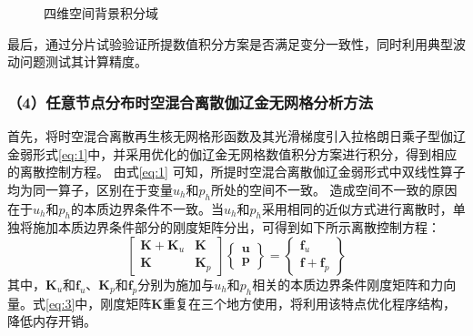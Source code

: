 \vspace{20pt}
\begin{figure}[!h]
    \centering 
    \hspace{24pt}
    \caption{四维空间背景积分域}
    \label{fg:domain}
\end{figure}
\newpage

最后，通过分片试验验证所提数值积分方案是否满足变分一致性，同时利用典型波动问题测试其计算精度。

\subsubsection*{\bfseries （4）任意节点分布时空混合离散伽辽金无网格分析方法}
首先，将时空混合离散再生核无网格形函数及其光滑梯度引入拉格朗日乘子型伽辽金弱形式\eqref{eq:1}中，并采用优化的伽辽金无网格数值积分方案进行积分，得到相应的离散控制方程。
由式\eqref{eq:1} 可知，所提时空混合离散伽辽金弱形式中双线性算子均为同一算子，区别在于变量$u_h$和$p_h$所处的空间不一致。
造成空间不一致的原因在于$u_h$和$p_h$的本质边界条件不一致。当$u_h$和$p_h$采用相同的近似方式进行离散时，单独将施加本质边界条件部分的刚度矩阵分出，可得到如下所示离散控制方程：
\begin{equation}
    \begin{bmatrix} 
        \boldsymbol K + \boldsymbol K_{u} & \boldsymbol K \\
        \boldsymbol K & \boldsymbol K_{p} 
    \end{bmatrix} 
    \begin{Bmatrix}
        \boldsymbol u \\ \boldsymbol p
    \end{Bmatrix} =
    \begin{Bmatrix} \boldsymbol f_u \\ \boldsymbol f + \boldsymbol f_p \end{Bmatrix}
    \label{eq:3} 
\end{equation}
其中，$\boldsymbol K_u$和$\boldsymbol f_u$、$\boldsymbol K_p$和$\boldsymbol f_p$分别为施加与$u_h$和$p_h$相关的本质边界条件刚度矩阵和力向量。式\eqref{eq:3}中，刚度矩阵$\boldsymbol K$重复在三个地方使用，将利用该特点优化程序结构，降低内存开销。

